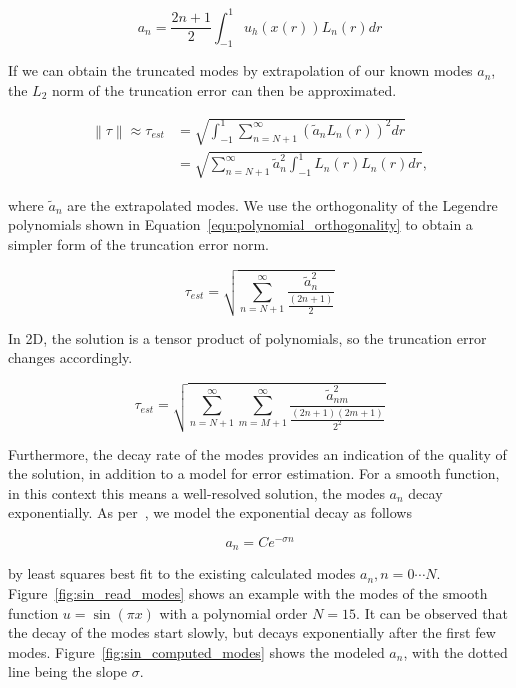 \begin{equation} \label{equ:modes}
	a_n = \frac{2n + 1}{2}\int_{-1}^{1}u_h(x(r))L_n(r)dr
\end{equation}

\noindent
If we can obtain the truncated modes by extrapolation of our known modes \(a_n\), the \(L_2\) norm
of the truncation error can then be approximated.

\begin{equation} \label{equ:error_norm}
	\begin{aligned}
		\left \| \tau \right \| \approx \tau_{est} &= \sqrt{\int_{-1}^{1} \sum_{n = N + 1}^{\infty } {\left( \widetilde{a}_n L_n(r) \right)}^2 dr} \\
		&= \sqrt{\sum_{n = N + 1}^{\infty }\widetilde{a}_n^2 \int_{-1}^{1} L_n(r) L_n(r) dr},
	\end{aligned}
\end{equation}

\noindent
where \(\widetilde{a}_n\) are the extrapolated modes. We use the orthogonality of the Legendre
polynomials shown in Equation~\ref{equ:polynomial_orthogonality} to obtain a simpler form of the
truncation error norm.

\begin{equation} \label{equ:error_norm_1D}
	\tau_{est} = \sqrt{\sum_{n = N + 1}^{\infty } \frac{\widetilde{a}_{n}^2}{\frac{(2n + 1)}{2}}}
\end{equation}

\noindent
In 2D, the solution is a tensor product of polynomials, so the truncation error changes accordingly. 

\begin{equation} \label{equ:error_norm_2D}
	\tau_{est} = \sqrt{\sum_{n = N + 1}^{\infty } \sum_{m = M + 1}^{\infty}\frac{\widetilde{a}_{nm}^2}{\frac{(2n + 1)(2m + 1)}{2^2}}}
\end{equation}

Furthermore, the decay rate of the modes provides an indication of the quality of the solution, in
addition to a model for error estimation. For a smooth function, in this context this means a
well-resolved solution, the modes \(a_n\) decay exponentially. As per~\cite{Mavriplis1990}, we model
the exponential decay as follows

\begin{equation} \label{equ:exponential_decay}
	a_n = Ce^{-\sigma n}
\end{equation}

\noindent
by least squares best fit to the existing calculated modes \(a_n, n = 0 \cdots N\).
Figure~\ref{fig:sin_read_modes} shows an example with the modes of the smooth function \(u = \sin(\pi
x)\) with a polynomial order \(N = 15\). It can be observed that the decay of the modes start
slowly, but decays exponentially after the first few modes. Figure~\ref{fig:sin_computed_modes}
shows the modeled \(a_n\), with the dotted line being the slope \( \sigma \).

